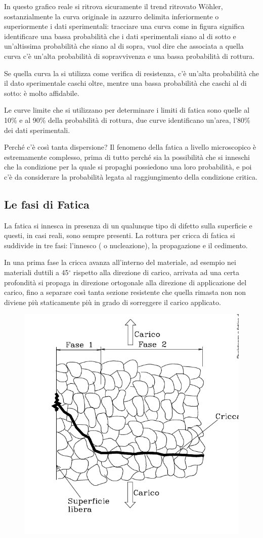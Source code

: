 		In questo grafico reale si ritrova sicuramente il trend ritrovato Wöhler, sostanzialmente la curva originale in azzurro delimita inferiormente o superiormente i dati sperimentali: tracciare una curva come in figura significa identificare una bassa probabilità che i dati sperimentali siano al di sotto e un'altissima probabilità che siano al di sopra, vuol dire che associata a quella curva c'è un'alta probabilità di sopravvivenza e una bassa probabilità di rottura. 
		
		Se quella curva la si utilizza come verifica di resistenza, c'è un'alta probabilità che il dato sperimentale caschi oltre, mentre una bassa probabilità che caschi al di sotto: è molto affidabile. 
		
		Le curve limite che si utilizzano per determinare i limiti di fatica sono quelle al 10\% e al 90\% della probabilità di rottura, due curve identificano un'area, l'80\% dei dati sperimentali. \newline
		
		Perché c'è così tanta dispersione? Il fenomeno della fatica a livello microscopico è estremamente complesso, prima di tutto perché sia la possibilità che si inneschi che la condizione per la quale si propaghi possiedono una loro probabilità, e poi c'è da considerare la probabilità legata al raggiungimento della condizione critica. 
		
		
\subsection{Le fasi di Fatica} 
		La fatica si innesca in presenza di un qualunque tipo di difetto sulla superficie e questi, in casi reali, sono sempre presenti. La rottura per cricca di fatica si suddivide in tre fasi: l'innesco ( o nucleazione), la propagazione e il cedimento. \newline
		
		In una prima fase la cricca avanza all'interno del materiale, ad esempio nei materiali duttili a 45$^\circ$ rispetto alla direzione di carico, arrivata ad una certa profondità si propaga in direzione ortogonale alla direzione di applicazione del carico, fino a separare così tanta sezione resistente che quella rimasta non non diviene più staticamente più in grado di sorreggere il carico applicato. 
		
		\begin{figure}[H]
			\centering
			\includegraphics[width=0.3\linewidth]{immagini_10/screenshot005}
			\label{fig:screenshot005}
		\end{figure}
				
